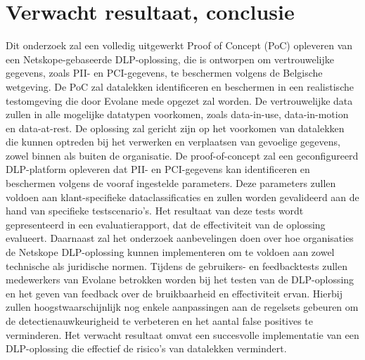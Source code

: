 

\section{Verwacht resultaat, conclusie}%
\label{sec:verwachte_resultaten}

Dit onderzoek zal een volledig uitgewerkt Proof of Concept (PoC) opleveren van een Netskope-gebaseerde DLP-oplossing, die is ontworpen om vertrouwelijke gegevens, 
zoals PII- en PCI-gegeve\-ns, te beschermen volgens de Belgische wetgeving. 
De PoC zal datalekken identificeren en beschermen in een realistische testomgeving die door Evolane mede opgezet zal worden. 
De vertrouwelijke data zullen in alle mogelijke datatypen voorkomen, zoals data-in-use, data-in-motion en data-at-rest. De oplossing zal gericht zijn op 
het voorkomen van datalekken die kunnen optreden bij het verwerken en verplaatsen van gevoelige gegevens, zowel binnen als buiten de organisatie.
De proof-of-concept zal een geconfigureerd DLP-platform opleveren dat PII- en PCI-gege\-vens kan identificeren en beschermen volgens de vooraf ingestelde parameters. 
Deze parameters zullen voldoen aan klant-specifieke dataclassificaties en zullen worden gevalideerd aan de hand van specifieke testscenario's. 
Het resultaat van deze tests wordt gepresenteerd in een evaluatierapport, dat de effectiviteit van de oplossing evalueert.
Daarnaast zal het onderzoek aanbevelingen doen over hoe organisaties de Netskope DLP-oplossing kunnen implementeren om te voldoen aan zowel technische als juridische normen. 
Tijdens de gebruikers- en feedbacktests zullen medewerkers van Evolane betrokken worden bij het testen van de DLP-oplossing en het geven van feedback over de bruikbaarheid en effectiviteit ervan. 
Hierbij zullen hoogstwaarschijnlijk nog enkele aanpassingen aan de regelsets gebeuren om de detectienauwkeurigheid te verbeteren en het aantal false positives te verminderen. 
Het verwacht resultaat omvat een succesvolle implementatie van een DLP-oplossing die effectief de risico's van datalekken vermindert. 


